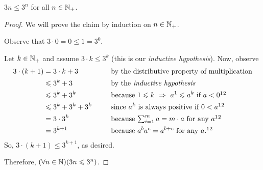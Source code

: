 \begin{theorem}
    $3n \leq 3^n$ for all $n \in \mathbb{N}_+$.
\end{theorem}
\begin{proof}
    We will prove the claim by induction on $n \in \mathbb{N}_+$.
    \begin{case}
        Observe that $3 \cdot 0 = 0 \leq 1 = 3^0$.
    \end{case}
    \begin{case}
        Let $k \in \mathbb{N}_+$ and assume $3 \cdot k \leq 3^k$
        (this is our \emph{inductive hypothesis}).
        Now, observe
        \begin{alignat*}{2}
            3 \cdot (k + 1) &= 3 \cdot k + 3 &&\text{ by the distributive property of multiplication} \\
                            &\leq 3^k + 3 &&\text{ by the \emph{inductive hypothesis}} \\
                            &\leq 3^k + 3^k &&\text{ because $1 \leq k \implies a^1 \leq a^k$ if $a < 0$}\footnotemark[1]\footnotemark[2] \\
                            &\leq 3^k + 3^k + 3^k~~~~&&\text{ since $a^k$ is always positive if $0 < a$}\footnotemark[1]\footnotemark[2] \\
                            &= 3 \cdot 3^k &&\text{ because $\textstyle \sum_{i = 1}^{m}a = m \cdot a$ for any $a$}\footnotemark[1]\footnotemark[2] \\
                            &= 3^{k + 1} &&\text{ because $a^ba^c = a^{b + c}$ for any $a$}.\footnotemark[1]\footnotemark[2]
        \end{alignat*}
        So, $3 \cdot (k + 1) \leq 3^{k + 1}$, as desired.
    \end{case}
    Therefore, $\pn*{\forall n \in \N}\pn*{3n \leq 3^n}$.
\end{proof}


